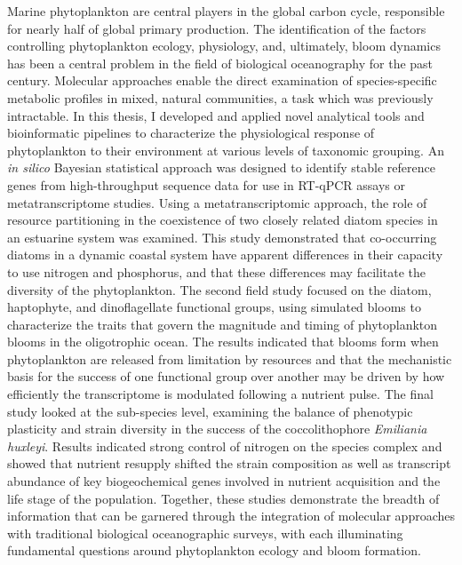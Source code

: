 Marine phytoplankton are central players in the global carbon cycle, responsible for nearly half of global primary production. The identification of the factors controlling phytoplankton ecology, physiology, and, ultimately, bloom dynamics has been a central problem in the field of biological oceanography for the past century. Molecular approaches enable the direct examination of species-specific metabolic profiles in mixed, natural communities, a task which was previously intractable. In this thesis, I developed and applied novel analytical tools and bioinformatic pipelines to characterize the physiological response of phytoplankton to their environment at various levels of taxonomic grouping. An \textit{in silico} Bayesian statistical approach was designed to identify stable reference genes from high-throughput sequence data for use in RT-qPCR assays or metatranscriptome studies. Using a metatranscriptomic approach, the role of resource partitioning in the coexistence of two closely related diatom species in an estuarine system was examined. This study demonstrated that co-occurring diatoms in a dynamic coastal system have apparent differences in their capacity to use nitrogen and phosphorus, and that these differences may facilitate the diversity of the phytoplankton. The second field study focused on the diatom, haptophyte, and dinoflagellate functional groups, using simulated blooms to characterize the traits that govern the magnitude and timing of phytoplankton blooms in the oligotrophic ocean. The results indicated that blooms form when phytoplankton are released from limitation by resources and that the mechanistic basis for the success of one functional group over another may be driven by how efficiently the transcriptome is modulated following a nutrient pulse. The final study looked at the sub-species level, examining the balance of phenotypic plasticity and strain diversity in the success of the coccolithophore \textit{Emiliania huxleyi}. Results indicated strong control of nitrogen on the species complex and showed that nutrient resupply shifted the strain composition as well as transcript abundance of key biogeochemical genes involved in nutrient acquisition and the life stage of the population. Together, these studies demonstrate the breadth of information that can be garnered through the integration of molecular approaches with traditional biological oceanographic surveys, with each illuminating fundamental questions around phytoplankton ecology and bloom formation.





